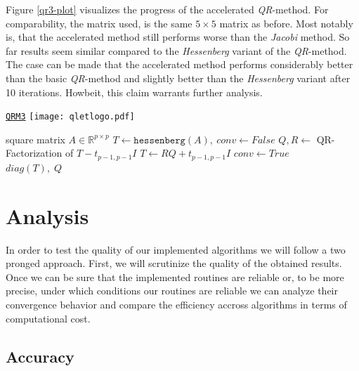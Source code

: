 \documentclass[12pt]{article}
\begin{document}
Figure \ref{qr3-plot} visualizes the progress of the accelerated \textit{QR}-method. For comparability, the matrix used, is the same $5 \times 5$ matrix as before. Most notably is, that the accelerated method still performs worse than the \textit{Jacobi} method. So far results seem similar compared to the \textit{Hessenberg} variant of the \textit{QR}-method. The case can be made that the accelerated method performs considerably better than the basic \textit{QR}-method and slightly better than the \textit{Hessenberg} variant after 10 iterations. Howbeit, this claim warrants further analysis.

\begin{algorithm}
\begin{algorithmic}[1]
\caption{\href {https://github.com/thsis/NIS18/blob/master/algorithms/eigen.py}{\texttt{QRM3}}  \protect\texttt{[image: qletlogo.pdf]}}

\Require square matrix $A \in \mathbb{R}^{p \times p}$
\State $T \gets \texttt{hessenberg}(A),\ conv \gets False$
    \State $Q, R \gets$ QR-Factorization of $T - t_{p-1, p-1} I$
    \State $T \gets RQ + t_{p-1, p-1}I$
        \State $conv \gets True$
    \EndIf
\EndWhile\\
\Return $diag\left(T\right),\; Q$
\end{algorithmic}
\end{algorithm}

\section{Analysis}

In order to test the quality of our implemented algorithms we will follow a two pronged approach. First, we will scrutinize the quality of the obtained results. Once we can be sure that the implemented routines are reliable or, to be more precise, under which conditions our routines are reliable we can analyze their convergence behavior and compare the efficiency accross algorithms in terms of computational cost.
\subsection{Accuracy}
\end{document}
